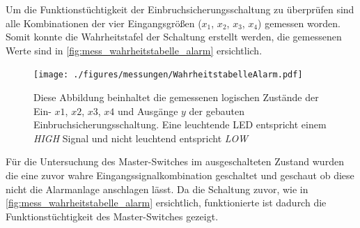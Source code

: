 \documentclass[12pt,english,ngerman]{scrartcl}
\begin{document}
Um die Funktionstüchtigkeit der Einbruchsicherungsschaltung zu überprüfen
sind alle Kombinationen der vier Eingangsgrößen ($x_1$, $x_2$, $x_3$, $x_4$)
gemessen worden. Somit konnte die Wahrheitstafel der Schaltung erstellt werden,
die gemessenen Werte sind in \autoref{fig:mess_wahrheitstabelle_alarm}
ersichtlich.

\begin{figure}[H]
  \centering
    \texttt{[image: ./figures/messungen/WahrheitstabelleAlarm.pdf]}
  \caption{Diese Abbildung beinhaltet die gemessenen logischen Zustände der
    Ein- $x1$, $x2$, $x3$, $x4$ und Ausgänge $y$ der gebauten
    Einbruchsicherungsschaltung. Eine leuchtende LED entspricht einem
    \textit{HIGH} Signal und nicht leuchtend entspricht \textit{LOW}}
  \label{fig:mess_wahrheitstabelle_alarm}
\end{figure}

Für die Untersuchung des Master-Switches im ausgeschalteten Zustand wurden die
eine zuvor wahre Eingangssignalkombination geschaltet und geschaut ob diese
nicht die Alarmanlage anschlagen lässt. Da die Schaltung zuvor, wie in
\autoref{fig:mess_wahrheitstabelle_alarm} ersichtlich, funktionierte ist
dadurch die Funktionstüchtigkeit des Master-Switches gezeigt.


\end{document}
